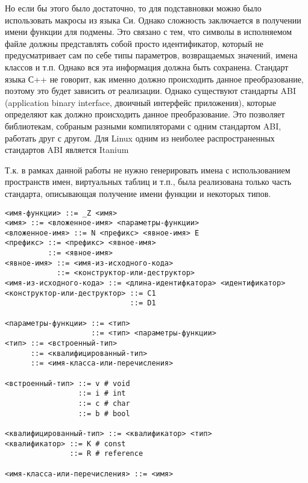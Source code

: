 Но если бы этого было достаточно, то для подставновки можно было использовать
макросы из языка Си. Однако сложность заключается в получении имени функции для
подмены. Это связано с тем, что символы в исполняемом файле должны представлять
собой просто идентификатор, который не предусматривает сам по себе типы
параметров, возвращаемых значений, имена классов и т.п.
Однако вся эта информация должна быть сохранена. Стандарт языка С++ не говорит,
как именно должно происходить данное преобразование, поэтому это будет зависить
от реализации. Однако существуют стандарты ABI (application binary interface,
двоичный интерфейс приложения), которые определяют как должно происходить данное
преобразование. Это позволяет библиотекам, собраным разными компиляторами с
одним стандартом ABI, работать друг с другом. Для Linux одним из неиболее
распространенных стандартов ABI является Itanium\cite{itaniumabi}

Т.к. в рамках данной работы не нужно генерировать имена с использованием
пространств имен, виртуальных таблиц и т.п., была реализована только часть
стандарта, описывающая получение имени функции и некоторых типов.

\begin{verbatim}
<имя-функции> ::= _Z <имя>
<имя> ::= <вложенное-имя> <параметры-функции>
<вложенное-имя> ::= N <префикс> <явное-имя> E
<префикс> ::= <префикс> <явное-имя>
          ::= <явное-имя>
<явное-имя> ::= <имя-из-исходного-кода>
            ::= <конструктор-или-деструктор>
<имя-из-исходного-кода> ::= <длина-идентифкатора> <идентификатор>
<конструктор-или-деструктор> ::= С1
                             ::= D1

<параметры-функции> ::= <тип>
                    ::= <тип> <параметры-функции>
<тип> ::= <встроенный-тип>
      ::= <квалифицированный-тип>
      ::= <имя-класса-или-перечисления>

<встроенный-тип> ::= v # void
                 ::= i # int
                 ::= c # char
                 ::= b # bool

<квалифицированный-тип> ::= <квалификатор> <тип>
<квалификатор> ::= K # const
               ::= R # reference

<имя-класса-или-перечисления> ::= <имя>
\end{verbatim}

\section{}
